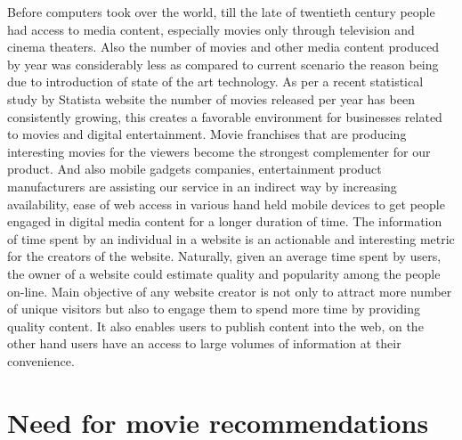 Before computers took over the world, till the late of twentieth century people had access to media content, especially movies only through television and cinema theaters. Also the number of movies and other media content produced by year was considerably less as compared to current scenario the reason being due to introduction of state of the art technology. As per a recent statistical study by Statista website \citep{number_of_movies_per_year_online} the number of movies released per year has been consistently growing, this creates a favorable environment for businesses related to movies and digital entertainment. Movie franchises that are producing interesting movies for the viewers become the strongest complementer for our product. And also mobile gadgets companies, entertainment product manufacturers are assisting our service in an indirect way by increasing availability, ease of web access in various hand held mobile devices to get people engaged in digital media content for a longer duration of time. The information of time spent by an individual in a website is an actionable and interesting metric for the creators of the website. Naturally, given an average time spent by users, the owner of a website could estimate quality and popularity among the people on-line. Main objective of any website creator is not only to attract more number of unique visitors but also to engage them to spend more time by providing quality content. It also enables users to publish content into the web, on the other hand users have an access to large volumes of information at their convenience. 

\section{Need for movie recommendations}

